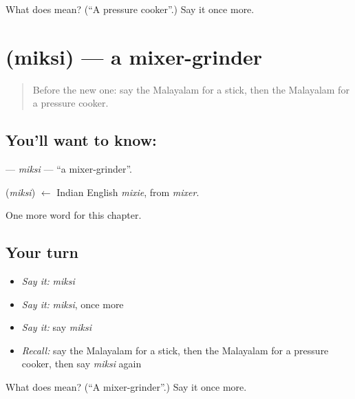 \begin{tcolorbox}[breakable,colback=teal!4,colframe=teal!35!black,title={Before you move on}]
What does  mean? (\textquotedblleft{}A pressure cooker\textquotedblright{}.) Say it once more.
\end{tcolorbox}
\section[\texorpdfstring{\ml{മിക്സി} (miksi)}{മിക്സി (miksi)}]{ (miksi) — a mixer-grinder}

\label{lesson:ML-C295-miksi}



\begin{quote}
Before the new one: say the Malayalam for a stick, then the Malayalam for a pressure cooker.
\end{quote}

\subsection*{You'll want to know: }
\textbf{} — \emph{miksi} — \textquotedblleft{}a mixer-grinder\textquotedblright{}.

\begin{cousinweb}
\textbf{} (\emph{miksi}) $\leftarrow$ Indian English \emph{mixie}, from \emph{mixer}.
\end{cousinweb}

\begin{grammarlens}[title={What you've built}]
One more word for this chapter.
\end{grammarlens}

\subsection*{Your turn}
\begin{itemize}
\raggedright
  \item \emph{Say it:} \emph{miksi}
  \item \emph{Say it:} \emph{miksi}, once more
  \item \emph{Say it:} say \emph{miksi}
  \item \emph{Recall:} say the Malayalam for a stick, then the Malayalam for a pressure cooker, then say \emph{miksi} again
\end{itemize}

\begin{tcolorbox}[breakable,colback=teal!4,colframe=teal!35!black,title={Before you move on}]
What does  mean? (\textquotedblleft{}A mixer-grinder\textquotedblright{}.) Say it once more.
\end{tcolorbox}
